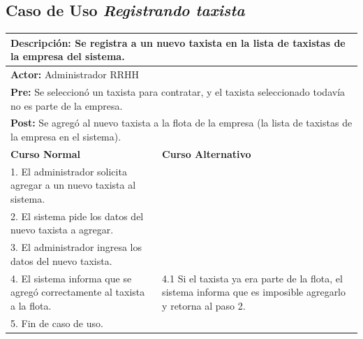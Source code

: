 \documentclass[a4paper]{article}
\begin{document}
\subsection{Caso de Uso \textit{Registrando taxista}}
\begin{center}
\begin{tabular}{|p{10cm} | p{6cm}|}
\hline
\multicolumn{2}{|p{15cm}|}{\textbf{Descripci\'on:} Se registra a un nuevo taxista en la lista de taxistas de la empresa del sistema.} \\
\hline
\multicolumn{2}{|l|}{\textbf{Actor:} Administrador RRHH } \\
\hline
\multicolumn{2}{|p{15cm}|}{\textbf{Pre:} Se seleccion\'o un taxista para contratar, y el taxista seleccionado todav\'ia no es parte de la empresa. } \\
\hline
\multicolumn{2}{|p{15cm}|}{\textbf{Post:} Se agreg\'o al nuevo taxista a la flota de la empresa (la lista de taxistas de la empresa en el sistema). }\\
\hline
\textbf{Curso Normal}  & \textbf{Curso Alternativo} \\ \hline
1. El administrador solicita agregar a un nuevo taxista al sistema. & \\ \hline
2. El sistema pide los datos del nuevo taxista a agregar. & \\ \hline
3. El administrador ingresa los datos del nuevo taxista. & \\ \hline
4. El sistema informa que se agreg\'o correctamente al taxista a la flota. & 4.1 Si el taxista ya era parte de la flota, el sistema informa que es imposible agregarlo y retorna al paso 2. \\ \hline
5. Fin de caso de uso. & \\ \hline

\end{tabular}
\end{center}
\end{document}
